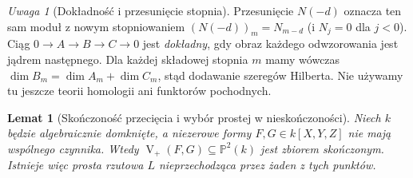 \documentclass[11pt,a4paper,openany]{report}
\numberwithin{equation}{section}
\theoremstyle{plain}
\newtheorem{lemat}[twierdzenie]{Lemat}
\theoremstyle{definition}
\theoremstyle{remark}
\newtheorem{uwaga}[twierdzenie]{Uwaga}
\newcommand{\PP}{\mathbb P}
\newcommand{\V}{\operatorname V}
\begin{document}
\begin{uwaga}[Dokładność i przesunięcie stopnia]
Przesunięcie $N(-d)$ oznacza ten sam moduł z nowym
stopniowaniem $(N(-d))_m=N_{m-d}$ (i $N_j=0$ dla $j<0$).
Ciąg $0\to A\to B\to C\to0$ jest \emph{dokładny},
gdy obraz każdego odwzorowania jest jądrem następnego.
Dla każdej składowej stopnia $m$ mamy wówczas
$\dim B_m=\dim A_m+\dim C_m$, stąd dodawanie
szeregów Hilberta. Nie używamy tu jeszcze teorii
homologii ani funktorów pochodnych.
\end{uwaga}

\begin{lemat}[Skończoność przecięcia i wybór prostej w nieskończoności]
\label{lem:finiteness-plane-intersection}
Niech $k$ będzie algebraicznie domknięte, a niezerowe
formy $F,G\in k[X,Y,Z]$ nie mają wspólnego czynnika.
Wtedy $\V_+(F,G)\subseteq\PP^2(k)$ jest zbiorem skończonym.
Istnieje więc prosta rzutowa $L$ nieprzechodząca przez
żaden z tych punktów.
\end{lemat}
\end{document}
